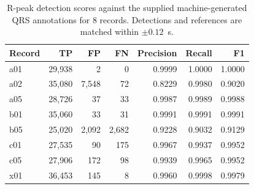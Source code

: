 \begin{table}[htbp]
\centering
\small
\begin{tabular}{lrrrrrr}
\toprule
Record & TP & FP & FN & Precision & Recall & F1 \\
\midrule
a01 & 29,938 & 2 & 0 & 0.9999 & 1.0000 & 1.0000 \\
a02 & 35,080 & 7,548 & 72 & 0.8229 & 0.9980 & 0.9020 \\
a05 & 28,726 & 37 & 33 & 0.9987 & 0.9989 & 0.9988 \\
b01 & 35,060 & 33 & 31 & 0.9991 & 0.9991 & 0.9991 \\
b05 & 25,020 & 2,092 & 2,682 & 0.9228 & 0.9032 & 0.9129 \\
c01 & 27,535 & 90 & 175 & 0.9967 & 0.9937 & 0.9952 \\
c05 & 27,906 & 172 & 98 & 0.9939 & 0.9965 & 0.9952 \\
x01 & 36,453 & 145 & 8 & 0.9960 & 0.9998 & 0.9979 \\
\bottomrule
\end{tabular}
\caption{R-peak detection scores against the supplied machine-generated QRS annotations for 8 records. Detections and references are matched within $\pm 0.12$~s.}

\label{tab:qrs}
\end{table}
